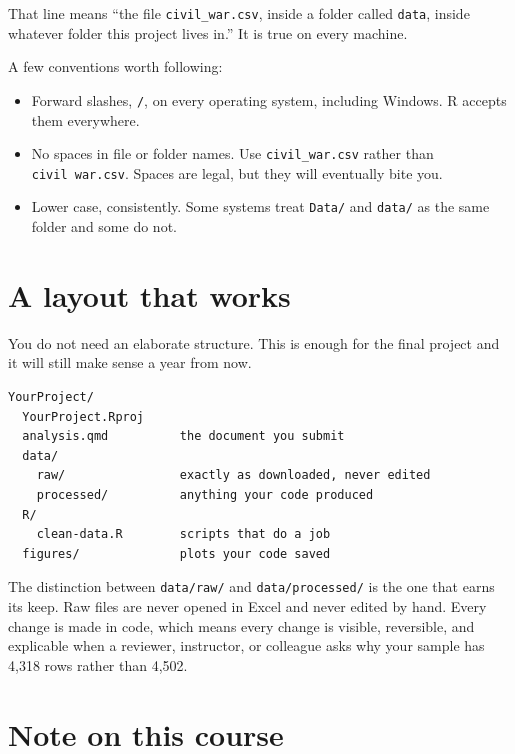 \documentclass[
  a4paper,
]{scrbook}
\providecommand{\tightlist}{%
  \setlength{\itemsep}{0pt}\setlength{\parskip}{0pt}}
\begin{document}
That line means ``the file \texttt{civil\_war.csv}, inside a folder
called \texttt{data}, inside whatever folder this project lives in.'' It
is true on every machine.

A few conventions worth following:

\begin{itemize}
\tightlist
\item
  Forward slashes, \texttt{/}, on every operating system, including
  Windows. R accepts them everywhere.
\item
  No spaces in file or folder names. Use \texttt{civil\_war.csv} rather
  than \texttt{civil\ war.csv}. Spaces are legal, but they will
  eventually bite you.
\item
  Lower case, consistently. Some systems treat \texttt{Data/} and
  \texttt{data/} as the same folder and some do not.
\end{itemize}

\section*{A layout that works}\label{a-layout-that-works}


You do not need an elaborate structure. This is enough for the final
project and it will still make sense a year from now.

\begin{verbatim}
YourProject/
  YourProject.Rproj
  analysis.qmd          the document you submit
  data/
    raw/                exactly as downloaded, never edited
    processed/          anything your code produced
  R/
    clean-data.R        scripts that do a job
  figures/              plots your code saved
\end{verbatim}

The distinction between \texttt{data/raw/} and \texttt{data/processed/}
is the one that earns its keep. Raw files are never opened in Excel and
never edited by hand. Every change is made in code, which means every
change is visible, reversible, and explicable when a reviewer,
instructor, or colleague asks why your sample has 4,318 rows rather than
4,502.

\section*{Note on this course}\label{note-on-this-course}
\end{document}
